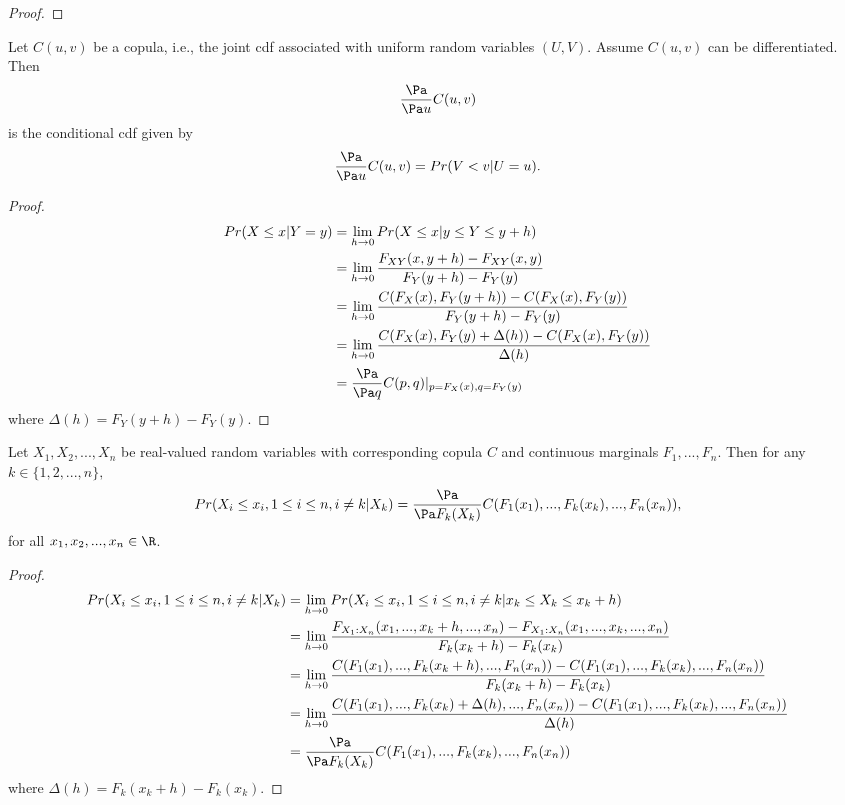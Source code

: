 \begin{refsection}
\begin{proof}
\end{proof}



\begin{lemma}\label{ch:statistical-models:th:partialDifferentialCopulaGivesConditionalDistributionBivariateDistribution}\cite[16]{schmitz2003copulas}
Let $C(u,v)$ be a copula, i.e., the joint cdf  associated with uniform random variables $(U,V)$. Assume $C(u,v)$ can be differentiated. Then
$$\frac{\Pa}{\Pa u}C(u,v)$$
is the conditional cdf given by
	$$\frac{\Pa}{\Pa u}C(u,v) = Pr(V<v|U=u).$$
\end{lemma}
\begin{proof}
\begin{align*}
Pr(X\leq x|Y = y) &= \lim_{h\to 0} Pr(X\leq x|y\leq Y \leq y+h) \\
&= \lim_{h\to 0} \frac{F_{XY}(x,y+h) - F_{XY}(x,y)}{F_Y(y+h) - F_Y(y)} \\
&= \lim_{h\to 0} \frac{C(F_X(x),F_Y(y+h)) - C(F_X(x),F_Y(y))}{F_Y(y+h) - F_Y(y)} \\
&= \lim_{h\to 0} \frac{C(F_X(x),F_Y(y) + \Delta(h)) - C(F_X(x),F_Y(y))}{\Delta(h)} \\
&= \frac{\Pa }{\Pa q}C(p,q)|_{p=F_X(x),q=F_Y(y)}
\end{align*}
where $\Delta(h) = F_Y(y+h) - F_Y(y).$
\end{proof}


\begin{lemma}\label{ch:statistical-models:th:partialDifferentialCopulaGivesConditionalDistributionMultipleConditionedOnOne}\cite[19]{schmitz2003copulas}
Let $X_1,X_2,...,X_n$ be real-valued random variables with corresponding copula $C$ and continuous marginals $F_1,...,F_n$. Then for any $k\in\{1,2,...,n\},$
$$Pr(X_i\leq x_i,1\leq i\leq n,i\neq k|X_k) = \frac{\Pa }{\Pa F_k(X_k)}C(F_1(x_1),...,F_k(x_k),...,F_n(x_n)),$$
for all $x_1,x_2,...,x_n \in \R$.
\end{lemma}
\begin{proof}
	\begin{align*}
	Pr(X_i\leq x_i,1\leq i\leq n,i\neq k|X_k) &= \lim_{h\to 0} Pr(X_i\leq x_i,1\leq i\leq n,i\neq k|x_k\leq X_k \leq x_k+h) \\
	&= \lim_{h\to 0} \frac{F_{X_1:X_n}(x_1,...,x_k+h,...,x_n) - F_{X_1:X_n}(x_1,...,x_k,...,x_n)}{F_{k}(x_k+h) - F_{k}(x_k)} \\
	&= \lim_{h\to 0} \frac{C(F_1(x_1),...,F_k(x_k+h),...,F_n(x_n)) - C(F_1(x_1),...,F_k(x_k),...,F_n(x_n))}{F_{k}(x_k+h) - F_{k}(x_k)} \\
	&= \lim_{h\to 0} \frac{C(F_1(x_1),...,F_k(x_k) + \Delta(h),...,F_n(x_n)) - C(F_1(x_1),...,F_k(x_k),...,F_n(x_n))}{\Delta(h)} \\
	&= \frac{\Pa }{\Pa F_k(X_k)}C(F_1(x_1),...,F_k(x_k),...,F_n(x_n))
	\end{align*}
	where $\Delta(h) = F_k(x_k+h) - F_k(x_k).$
\end{proof}



\end{refsection}
